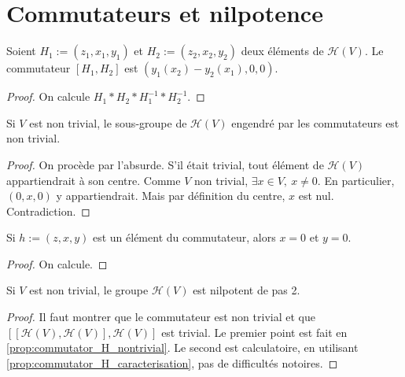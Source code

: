 \section{Commutateurs et nilpotence}

\begin{proposition}[Commutateur]
    \label{prop:commutator_H_of_elements}
    \leanok 

    Soient $H_1:=(z_1,x_1,y_1)$ et $H_2:=(z_2,x_2,y_2)$ deux éléments de 
    $\mathcal{H}(V)$. Le commutateur $[H_1,H_2]$ est $(y_1(x_2)-y_2(x_1),0,0)$.
    \begin{proof}
        \leanok
        On calcule $H_1*H_2*H_1^{-1}*H_2^{-1}$.
    \end{proof}
\end{proposition}

\begin{proposition}
    \label{prop:commutator_H_nontrivial}
    \leanok 

    Si $V$ est non trivial, le sous-groupe de $\mathcal{H}(V)$ engendré par les commutateurs est non trivial.
    \begin{proof}
        \leanok 
        On procède par l'absurde. S'il était trivial, tout élément de $\mathcal{H}(V)$
        appartiendrait à son centre.
        Comme $V$ non trivial, $\exists x\in V,\ x\ne0$. En particulier,
        $(0,x,0)$ y appartiendrait. Mais par définition du centre, $x$ est nul. Contradiction.
    \end{proof}
\end{proposition}

\begin{proposition}
        \label{prop:commutator_H_caracterisation}
        \leanok
    
        Si $h:=(z,x,y)$ est un élément du commutateur, alors $x=0$ et $y=0$.
    \begin{proof}
        \leanok
        On calcule.
    \end{proof}
\end{proposition}

\begin{theorem}
    \label{thm:two_step_nil}
    \leanok

    Si $V$ est non trivial, le groupe $\mathcal{H}(V)$ est nilpotent de pas 2.
    \begin{proof}
        \leanok
        Il faut montrer que le commutateur est non trivial et que $[[\mathcal{H}(V),\mathcal{H}(V)],\mathcal{H}(V)]$
        est trivial. Le premier point est fait en \ref{prop:commutator_H_nontrivial}.
        Le second est calculatoire, en utilisant \ref{prop:commutator_H_caracterisation}, pas de difficultés notoires.
    \end{proof}
\end{theorem}

